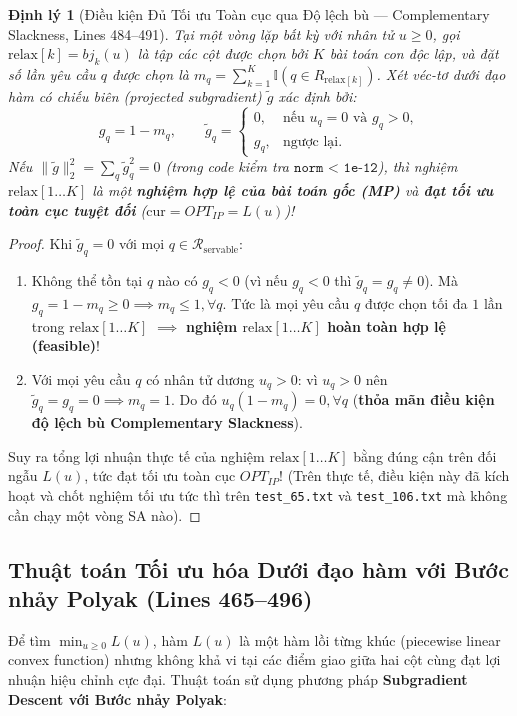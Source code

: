 \documentclass[11pt,a4paper]{article}
\newtheorem{theorem}{Định lý}[section]
\theoremstyle{definition}
\begin{document}
\begin{theorem}[Điều kiện Đủ Tối ưu Toàn cục qua Độ lệch bù --- Complementary Slackness, Lines 484--491]
Tại một vòng lặp bất kỳ với nhân tử $u \ge 0$, gọi $\text{relax}[k] = bj_k(u)$ là tập các cột được chọn bởi $K$ bài toán con độc lập, và đặt số lần yêu cầu $q$ được chọn là $m_q = \sum_{k=1}^K \mathbb{I}(q \in R_{\text{relax}[k]})$. Xét véc-tơ dưới đạo hàm có chiếu biên (projected subgradient) $\tilde{g}$ xác định bởi:
\begin{equation}
    g_q = 1 - m_q, \qquad \tilde{g}_q = \begin{cases}
    0, & \text{nếu } u_q = 0 \text{ và } g_q > 0,\\
    g_q, & \text{ngược lại.}
    \end{cases}
\end{equation}
Nếu $\|\tilde{g}\|_2^2 = \sum_{q} \tilde{g}_q^2 = 0$ (trong code kiểm tra $\texttt{norm < 1e-12}$), thì nghiệm $\text{relax}[1\dots K]$ là một \textbf{nghiệm hợp lệ của bài toán gốc (MP)} và \textbf{đạt tối ưu toàn cục tuyệt đối} ($\text{cur} = OPT_{IP} = L(u)$)!
\end{theorem}
\begin{proof}
Khi $\tilde{g}_q = 0$ với mọi $q \in \mathcal{R}_{\text{servable}}$:
\begin{enumerate}[leftmargin=1.5em]
    \item Không thể tồn tại $q$ nào có $g_q < 0$ (vì nếu $g_q < 0$ thì $\tilde{g}_q = g_q \neq 0$). Mà $g_q = 1 - m_q \ge 0 \implies m_q \le 1, \forall q$. Tức là mọi yêu cầu $q$ được chọn tối đa $1$ lần trong $\text{relax}[1\dots K]$ $\implies$ \textbf{nghiệm $\text{relax}[1\dots K]$ hoàn toàn hợp lệ (feasible)}!
    \item Với mọi yêu cầu $q$ có nhân tử dương $u_q > 0$: vì $u_q > 0$ nên $\tilde{g}_q = g_q = 0 \implies m_q = 1$. Do đó $u_q (1 - m_q) = 0, \forall q$ (\textbf{thỏa mãn điều kiện độ lệch bù Complementary Slackness}).
\end{enumerate}
Suy ra tổng lợi nhuận thực tế của nghiệm $\text{relax}[1\dots K]$ bằng đúng cận trên đối ngẫu $L(u)$, tức đạt tối ưu toàn cục $OPT_{IP}$! (Trên thực tế, điều kiện này đã kích hoạt và chốt nghiệm tối ưu tức thì trên \texttt{test\_65.txt} và \texttt{test\_106.txt} mà không cần chạy một vòng SA nào).
\end{proof}

\subsection{Thuật toán Tối ưu hóa Dưới đạo hàm với Bước nhảy Polyak (Lines 465--496)}
Để tìm $\min_{u \ge 0} L(u)$, hàm $L(u)$ là một hàm lồi từng khúc (piecewise linear convex function) nhưng không khả vi tại các điểm giao giữa hai cột cùng đạt lợi nhuận hiệu chỉnh cực đại. Thuật toán sử dụng phương pháp \textbf{Subgradient Descent với Bước nhảy Polyak}:
\end{document}
